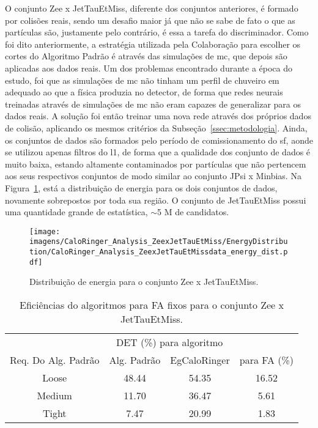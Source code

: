 O conjunto Zee x JetTauEtMiss, diferente dos conjuntos anteriores, é formado por
colisões reais, sendo um desafio maior já que não se sabe de fato o que as
partículas são, justamente pelo contrário, é essa a tarefa do discriminador.
Como foi dito anteriormente, a estratégia utilizada pela Colaboração para
escolher os cortes do Algoritmo Padrão é através das simulações de \gls{mc}, que
depois são aplicadas aos dados reais. Um dos problemas encontrado durante a
época do estudo, foi que as simulações de \gls{mc} não tinham um perfil de
chuveiro \gls{em} adequado ao que a física produzia no detector, de forma que
redes neurais treinadas através de simulações de \gls{mc} não eram capazes de
generalizar para os dados reais. A solução foi então treinar uma nova rede
através dos próprios dados de colisão, aplicando os mesmos critérios da
Subseção~\ref{ssec:metodologia}. Ainda, os conjuntos de dados são formados pelo
período de comissionamento do \gls{sf}, aonde se utilizou apenas filtros do
\gls{l1}, de forma que a qualidade dos conjunto de dados é muito baixa, estando
altamente contaminados por partículas que não pertencem aos seus respectivos
conjuntos de modo similar ao conjunto JPsi x Minbias. Na
Figura~\ref{fig:zeexjet_distenergia}, está a distribuição de energia para os
dois conjuntos de dados, novamente sobrepostos por toda sua região. O conjunto
de JetTauEtMiss possui uma quantidade grande de estatística, $\sim$5 M de
candidatos.

\begin{figure}[ht]
\centering
\texttt{[image: imagens/CaloRinger\_Analysis\_ZeexJetTauEtMiss/EnergyDistribution/CaloRinger\_Analysis\_ZeexJetTauEtMissdata\_energy\_dist.pdf]}
\label{fig:zeexjet_distenergia}
\caption{Distribuição de energia para o conjunto Zee x JetTauEtMiss.}
\end{figure}

\begin{table}[htb]
\centering
\begin{tabular}{cccc}
\hline
\hline
 & 
\multicolumn{2}{c}{DET (\%) para algoritmo} & 
\\
\cline{2-3}
\multirow{-2}{*}{Req. Do Alg. Padrão} & 
Alg. Padrão & 
EgCaloRinger & 
\multirow{-2}{*}{para FA (\%)} \\
\hline
Loose &  48.44 & 54.35 & 16.52 \\
Medium & 11.70 & 36.47 & 5.61 \\
Tight & 7.47 & 20.99 &  1.83 \\
\hline
\hline
\end{tabular}
\caption{Eficiências do algoritmos para FA fixos para o conjunto Zee x JetTauEtMiss.}
\label{tab:zeexjet_efic}
\end{table}


